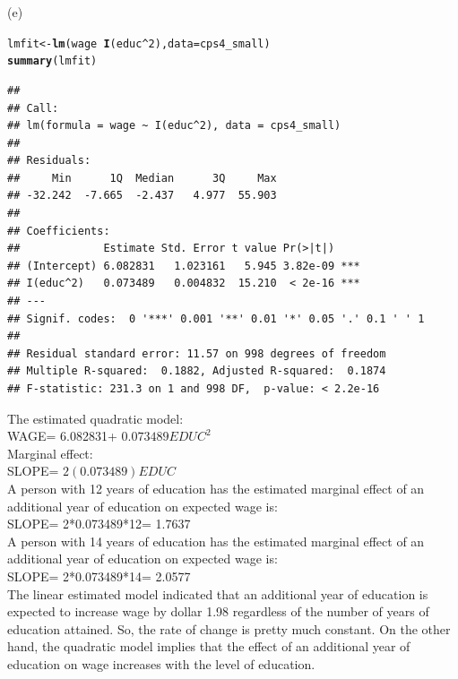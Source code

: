 \documentclass[a4paper]{article}\usepackage[]{graphicx}\usepackage[]{color}
\makeatletter
\newcommand{\hlnum}[1]{\textcolor[rgb]{0.686,0.059,0.569}{#1}}%
\newcommand{\hlopt}[1]{\textcolor[rgb]{0,0,0}{#1}}%
\newcommand{\hlstd}[1]{\textcolor[rgb]{0.345,0.345,0.345}{#1}}%
\newcommand{\hlkwb}[1]{\textcolor[rgb]{0.69,0.353,0.396}{#1}}%
\newcommand{\hlkwc}[1]{\textcolor[rgb]{0.333,0.667,0.333}{#1}}%
\newcommand{\hlkwd}[1]{\textcolor[rgb]{0.737,0.353,0.396}{\textbf{#1}}}%
\newenvironment{kframe}{%
 \def\at@end@of@kframe{}%
 \ifinner\ifhmode%
  \def\at@end@of@kframe{\end{minipage}}%
  \begin{minipage}{\columnwidth}%
 \fi\fi%
 \def\FrameCommand##1{\hskip\@totalleftmargin \hskip-\fboxsep
 \colorbox{shadecolor}{##1}\hskip-\fboxsep
     \hskip-\linewidth \hskip-\@totalleftmargin \hskip\columnwidth}%
 \MakeFramed {\advance\hsize-\width
   \@totalleftmargin\z@ \linewidth\hsize
   \@setminipage}}%
 {\par\unskip\endMakeFramed%
 \at@end@of@kframe}
\newenvironment{knitrout}{}{} %
\makeatother
\begin{document}
(e)

\begin{knitrout}
\color{fgcolor}\begin{kframe}
\begin{alltt}
\hlstd{lmfit} \hlkwb{<-} \hlkwd{lm}\hlstd{(wage}\hlopt{~}\hlkwd{I}\hlstd{(educ} \hlopt{^}\hlnum{2}\hlstd{),} \hlkwc{data}\hlstd{= cps4_small)}
\hlkwd{summary}\hlstd{(lmfit)}
\end{alltt}
\begin{verbatim}
## 
## Call:
## lm(formula = wage ~ I(educ^2), data = cps4_small)
## 
## Residuals:
##     Min      1Q  Median      3Q     Max 
## -32.242  -7.665  -2.437   4.977  55.903 
## 
## Coefficients:
##             Estimate Std. Error t value Pr(>|t|)    
## (Intercept) 6.082831   1.023161   5.945 3.82e-09 ***
## I(educ^2)   0.073489   0.004832  15.210  < 2e-16 ***
## ---
## Signif. codes:  0 '***' 0.001 '**' 0.01 '*' 0.05 '.' 0.1 ' ' 1
## 
## Residual standard error: 11.57 on 998 degrees of freedom
## Multiple R-squared:  0.1882,	Adjusted R-squared:  0.1874 
## F-statistic: 231.3 on 1 and 998 DF,  p-value: < 2.2e-16
\end{verbatim}
\end{kframe}
\end{knitrout}

The estimated quadratic model:\\

WAGE= 6.082831+ $0.073489EDUC^2$\\

Marginal effect:\\

SLOPE= $2(0.073489)EDUC$\\

A person with 12 years of education has the estimated marginal effect of an additional
year of education on expected wage is:\\

SLOPE= 2*0.073489*12= 1.7637\\

A person with 14 years of education has the estimated marginal effect of an additional
year of education on expected wage is:\\

SLOPE= 2*0.073489*14= 2.0577\\

The linear estimated model indicated that an additional year of education is expected to increase wage by dollar 1.98 regardless of the number of years of education attained. So, the rate of change is pretty much constant. On the other hand, the quadratic model implies that the effect of an additional year of education on wage increases with the level of education.\\
\end{document}
